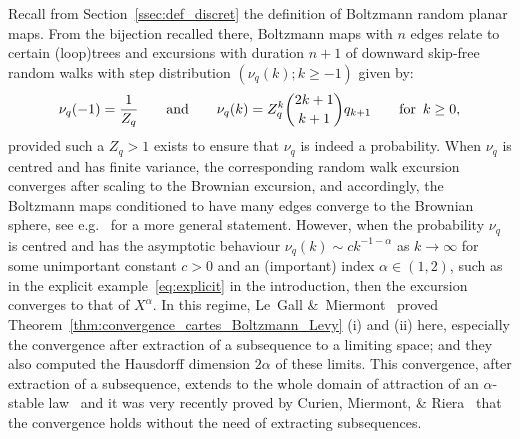 \documentclass[british, a4paper,11pt]{article}
\numberwithin{equation}{section}
\theoremstyle{definition}
\begin{document}
Recall from Section~\ref{ssec:def_discret}  the definition of Boltzmann random planar maps. From the bijection recalled there, Boltzmann maps with $n$ edges relate to certain (loop)trees and excursions with duration $n+1$ of downward skip-free random walks with step distribution $(\nu_q(k) ; k \ge -1)$ given by:
\[\nu_q(-1) = \frac{1}{Z_q}
\qquad\text{and}\qquad
\nu_q(k) = Z_q^k \binom{2k+1}{k+1} q_{k+1}
\qquad\text{for}\enskip k \ge 0
,\]
provided such a $Z_q > 1$ exists to ensure that $\nu_q$ is indeed a probability.
When $\nu_q$ is centred and has finite variance, the corresponding random walk excursion converges after scaling to the Brownian excursion, and accordingly, the Boltzmann maps conditioned to have many edges converge to the Brownian sphere, see e.g.~\cite[Section~6.4]{Mar19} for a more general statement.
However, when the probability $\nu_q$ is centred  and has the asymptotic behaviour $\nu_q(k) \sim c k^{-1-\alpha}$ as $k \to \infty$ for some unimportant constant $c>0$ and an (important) index $\alpha \in (1,2)$, such as in the explicit example~\eqref{eq:explicit} in the introduction, then the excursion converges to that of $X^\alpha$. In this regime, Le~Gall \&~Miermont~\cite{LGM11} proved Theorem~\ref{thm:convergence_cartes_Boltzmann_Levy} (i) and (ii) here, especially the convergence after extraction of a subsequence to a limiting space; and they also computed the Hausdorff dimension $2\alpha$ of these limits.
This convergence, after extraction of a subsequence, extends to the whole domain of attraction of an $\alpha$-stable law~\cite[Section~6.4]{Mar19} and it was very recently proved by Curien, Miermont, \& Riera~\cite{CMR25} that the convergence holds 
without the need of extracting subsequences.
\end{document}
